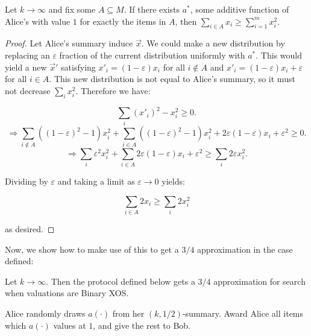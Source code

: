 \begin{lemma}Let $k \rightarrow \infty$ and fix some $A \subseteq M$. If there exists $a^*$, some additive function of Alice's with value $1$ for exactly the items in $A$, then $\sum_{i \in A} x_i \geq \sum_{i=1}^m x_i^2$.
\end{lemma}

\begin{proof}
Let Alice's summary induce $\vec{x}$. We could make a new distribution by replacing an $\varepsilon$ fraction of the current distribution uniformly with $a^*$. This would yield a new $\vec{x}'$ satisfying $x'_i = (1-\varepsilon)x_i$ for all $i \notin A$ and $x'_i = (1-\varepsilon)x_i + \varepsilon$ for all $i \in A$. This new distribution is not equal to Alice's summary, so it must not decrease $\sum_i x^2_i$. Therefore we have:

$$\sum_i (x'_i)^2 - x_i^2\geq 0.$$
$$\Longrightarrow \sum_{i \notin A} ((1-\varepsilon)^2 - 1)x^2_i  + \sum_{i \in A} ((1-\varepsilon)^2 -1)x^2_i + 2\varepsilon (1-\varepsilon) x_i +\varepsilon^2 \geq 0.$$
$$\Longrightarrow \sum_i \varepsilon^2 x_i^2 +\sum_{i \in A} 2\varepsilon(1-\varepsilon)x_i + \varepsilon^2 \geq \sum_i 2\varepsilon x_i^2.$$

Dividing by $\varepsilon$ and taking a limit as $\varepsilon\rightarrow 0$ yields:

$$\sum_{i \in A} 2x_i \geq \sum_i 2x_i^2$$

as desired.
\end{proof}

Now, we show how to make use of this to get a $3/4$ approximation in the case defined:

\begin{theorem} Let $k \rightarrow \infty$. Then the protocol defined below gets a $3/4$ approximation for search when valuations are Binary XOS.

\end{theorem}

Alice randomly draws $a(\cdot)$ from her $(k, 1/2)$-summary. Award Alice all items which $a(\cdot)$ values at $1$, and give the rest to Bob. \\

